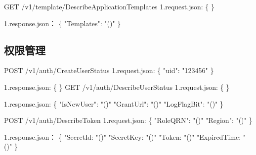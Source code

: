 GET /v1/template/DescribeApplicationTemplates
1.request.json:
\{
\}

1.response.json：
\{
"Templates": "\@exists()"
\}

\subsection{权限管理}

POST /v1/auth/CreateUserStatus
1.request.json:
\{
"uid": "123456"
\}

1.response.json:
\{
\}
GET /v1/auth/DescribeUserStatus
1.request.json:
\{
\}

1.response.json:
\{
"IsNewUser": "\@exists()"
"GrantUrl": "\@exists()"
"LogFlagBit": "\@exists()"
\}

POST /v1/auth/DescribeToken
1.request.json:
\{
"RoleQRN": "\@notEmpty()"
"Region": "\@notEmpty()"
\}

1.response.json：
\{
"SecretId: "\@notEmpty()"
"SecretKey: "\@notEmpty()"
"Token: "\@exists()"
"ExpiredTime: "\@exists()"
\}

